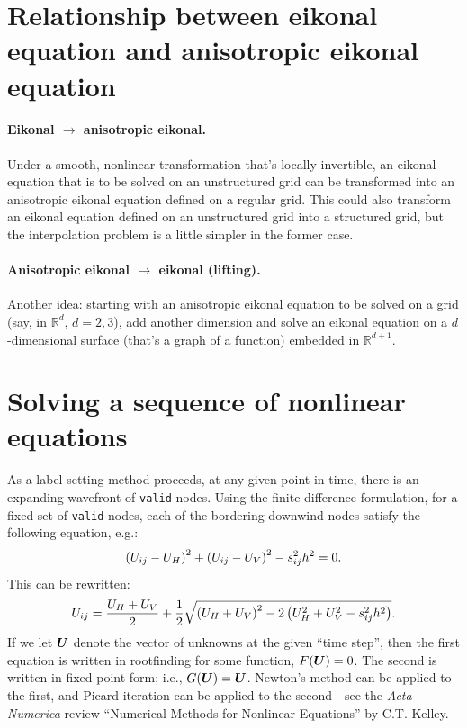 \documentclass[eikonal.tex]{subfiles}
\begin{document}
\section{Relationship between eikonal equation and anisotropic eikonal
  equation}

\paragraph{Eikonal $\to$ anisotropic eikonal.} Under a smooth,
nonlinear transformation that's locally invertible, an eikonal
equation that is to be solved on an unstructured grid can be
transformed into an anisotropic eikonal equation defined on a regular
grid. This could also transform an eikonal equation defined on an
unstructured grid into a structured grid, but the interpolation
problem is a little simpler in the former case.

\paragraph{Anisotropic eikonal $\to$ eikonal (lifting).} Another idea:
starting with an anisotropic eikonal equation to be solved on a grid
(say, in $\mathbb{R}^d$, $d = 2, 3$), add another dimension and solve
an eikonal equation on a $d$-dimensional surface (that's a graph of a
function) embedded in $\mathbb{R}^{d + 1}$.

\section{Solving a sequence of nonlinear equations}

As a label-setting method proceeds, at any given point in time, there
is an expanding wavefront of \texttt{valid} nodes. Using the finite
difference formulation, for a fixed set of \texttt{valid} nodes, each
of the bordering downwind nodes satisfy the following equation, e.g.:
\begin{equation}
  \left(U_{ij} - U_H\right)^2 + \left(U_{ij} - U_V\right)^2 - s_{ij}^2 h^2 = 0.
\end{equation}
This can be rewritten:
\begin{equation}
  U_{ij} = \frac{U_H + U_V}{2} + \frac{1}{2} \sqrt{\left(U_H + U_V\right)^2 - 2\left(U_H^2 + U_V^2 - s_{ij}^2 h^2\right)}.
\end{equation}
If we let $\boldsymbol{U}$ denote the vector of unknowns at the given ``time
step'', then the first equation is written in rootfinding for some
function, $F(\boldsymbol{U}) = 0$. The second is written in fixed-point form;
i.e., $G(\boldsymbol{U}) = \boldsymbol{U}$. Newton's method can be applied to the first,
and Picard iteration can be applied to the second---see the \emph{Acta
  Numerica} review ``Numerical Methods for Nonlinear Equations'' by
C.T. Kelley.
\end{document}
